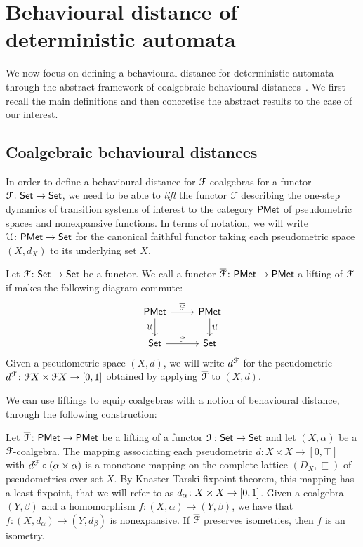 \section{Behavioural distance of deterministic automata}\label{c2:sec:behavioural_distance}
We now focus on defining a behavioural distance for deterministic automata through the abstract framework of coalgebraic behavioural distances~\cite{Baldan:2018:Coalgebraic}. We first recall the main definitions and then concretise the abstract results to the case of our interest.
\subsection{Coalgebraic behavioural distances}\label{c2:subsec:coalgebraic_behavioural_distances}
In order to define a behavioural distance for $\mathcal{F}$-coalgebras for a functor $\mathcal{F} \colon {\mathsf{Set}} \to {\mathsf{Set}}$, we need to be able to \emph{lift} the functor $\mathcal{F}$ describing the one-step dynamics of transition systems of interest to the category $\mathsf{PMet}$ of pseudometric spaces and nonexpansive functions. In terms of notation, we will write $\mathcal{U} \colon \mathsf{PMet} \to {\mathsf{Set}}$ for the canonical faithful functor taking each pseudometric space $(X, d_X)$ to its underlying set $X$.
\begin{definition}\label{c2:def:lifting}
	Let $\mathcal{F} \colon {\mathsf{Set}} \to {\mathsf{Set}}$ be a functor. We call a functor $\overline{\mathcal{F}} \colon \mathsf{PMet} \to \mathsf{PMet}$ a lifting of $\mathcal{F}$ if makes the following diagram commute:
\[\begin{tikzcd}
	\PMet & \PMet \\
	\Set & \Set
	\arrow["{\overline{\funF}}", from=1-1, to=1-2]
	\arrow["\forget"', from=1-1, to=2-1]
	\arrow["\forget", from=1-2, to=2-2]
	\arrow["\funF", from=2-1, to=2-2]
\end{tikzcd}\]
Given a pseudometric space $(X, d)$, we will write $d^{\mathcal{F}}$ for the pseudometric $d^{\funF} \colon \funF X \times \funF X \to \interval{0}{1}$ obtained by applying $\overline{\mathcal{F}}$ to $(X,d)$.
\end{definition}
We can use liftings to equip coalgebras with a notion of behavioural distance, through the following construction:
\begin{lemma}\label{c2:lem:behavioural_distances}
	Let $\overline{\mathcal{F}} \colon \mathsf{PMet} \to \mathsf{PMet}$ be a lifting of a functor $\mathcal{F} \colon {\mathsf{Set}} \to {\mathsf{Set}}$ and let $(X, \alpha)$ be a $\mathcal{F}$-coalgebra. The mapping associating each pseudometric $d \colon X \times X \to [0,\top]$ with $d^{\mathcal{F}} \circ (\alpha \times \alpha)$ is a monotone mapping on the complete lattice $(D_X, \sqsubseteq)$ of pseudometrics over set $X$. By Knaster-Tarski fixpoint theorem, this mapping has a least fixpoint, that we will refer to as $d_\alpha \colon X \times X \to \interval{0}{1}$. Given a coalgebra $(Y, \beta)$ and a homomorphism $f \colon (X, \alpha) \to (Y, \beta)$, we have that $f \colon (X, d_\alpha) \to (Y, d_\beta)$ is nonexpansive. If $\overline{\mathcal{F}}$ preserves isometries, then $f$ is an isometry.
\end{lemma}
